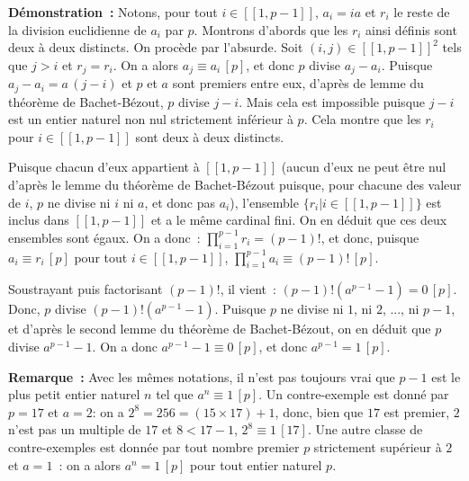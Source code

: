\medskip

\noindent\textbf{Démonstration :} Notons, pour tout $i \in [\![1, p-1]\!]$, $a_i = i a$ et $r_i$ le reste de la division euclidienne de $a_i$ par $p$. 
Montrons d'abords que les $r_i$ ainsi définis sont deux à deux distincts. 
On procède par l'absurde. 
Soit $(i,j) \in [\![1, p-1]\!]^2$ tels que $j > i$ et $r_j = r_i$. 
On a alors $a_j \equiv a_i \, [p]$, et donc $p$ divise $a_j - a_i$. 
Puisque $a_j - a_i = a \, (j-i)$ et $p$ et $a$ sont premiers entre eux, d'après de lemme du théorème de Bachet-Bézout, $p$ divise $j-i$. 
Mais cela est impossible puisque $j-i$ est un entier naturel non nul strictement inférieur à $p$. 
Cela montre que les $r_i$ pour $i \in [\![1, p-1]\!]$ sont deux à deux distincts. 

Puisque chacun d'eux appartient à $[\![1, p-1]\!]$ (aucun d'eux ne peut être nul d'après le lemme du théorème de Bachet-Bézout puisque, pour chacune des valeur de $i$, $p$ ne divise ni $i$ ni $a$, et donc pas $a_i$), l'ensemble $\lbrace r_i \vert i \in [\![1, p-1]\!] \rbrace$ est inclus dans $[\![1, p-1]\!]$ et a le même cardinal fini. 
On en déduit que ces deux ensembles sont égaux. 
On a donc : $\prod_{i=1}^{p-1} r_i = (p-1)!$, et donc, puisque $a_i \equiv r_i \, [p]$ pour tout $i \in [\![1, p-1]\!]$, $\prod_{i=1}^{p-1} a_i \equiv (p-1)! \, [p]$.

Soustrayant puis factorisant $(p-1)!$, il vient : $(p-1)! \left( a^{p-1} - 1 \right) = 0 \, [p]$. 
Donc, $p$ divise $(p-1)! \left( a^{p-1} - 1 \right)$. 
Puisque $p$ ne divise ni $1$, ni $2$, ..., ni $p-1$, et d'après le second lemme du théorème de Bachet-Bézout, on en déduit que $p$ divise $a^{p-1} - 1$. 
On a donc $a^{p-1} - 1 \equiv 0 \, [p]$, et donc $a^{p-1} = 1 \, [p]$.

\done

\medskip

\noindent\textbf{Remarque :} Avec les mêmes notations, il n'est pas toujours vrai que $p-1$ est le plus petit entier naturel $n$ tel que $a^n \equiv 1 \, [p]$.
    Un contre-exemple est donné par $p = 17$ et $a = 2$: on a $2^8 = 256 = (15 \times 17) + 1$, donc, bien que $17$ est premier, $2$ n'est pas un multiple de $17$ et $8 < 17 - 1$, $2^8 \equiv 1 \, [17]$. 
    Une autre classe de contre-exemples est donnée par tout nombre premier $p$ strictement supérieur à $2$ et $a = 1$ : on a alors $a^n = 1 \, [p]$ pour tout entier naturel $p$.
